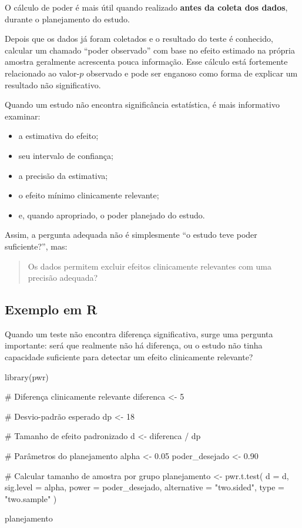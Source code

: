 \begin{error}

O cálculo de poder é mais útil quando realizado \textbf{antes da coleta dos
dados}, durante o planejamento do estudo.

Depois que os dados já foram coletados e o resultado do teste é conhecido,
calcular um chamado ``poder observado'' com base no efeito estimado na própria
amostra geralmente acrescenta pouca informação. Esse cálculo está fortemente
relacionado ao valor-$p$ observado e pode ser enganoso como forma de explicar
um resultado não significativo.

Quando um estudo não encontra significância estatística, é mais informativo
examinar:

\begin{itemize}
    \item a estimativa do efeito;
    \item seu intervalo de confiança;
    \item a precisão da estimativa;
    \item o efeito mínimo clinicamente relevante;
    \item e, quando apropriado, o poder planejado do estudo.
\end{itemize}

Assim, a pergunta adequada não é simplesmente ``o estudo teve poder
suficiente?'', mas:

\begin{quote}
Os dados permitem excluir efeitos clinicamente relevantes com uma precisão
adequada?
\end{quote}
\end{error}

\subsection{Exemplo em R}

Quando um teste não encontra diferença significativa, surge uma pergunta
importante: será que realmente não há diferença, ou o estudo não tinha
capacidade suficiente para detectar um efeito clinicamente relevante?

\begin{code}
library(pwr)

# Diferença clinicamente relevante
diferenca <- 5

# Desvio-padrão esperado
dp <- 18

# Tamanho de efeito padronizado
d <- diferenca / dp

# Parâmetros do planejamento
alpha <- 0.05
poder_desejado <- 0.90

# Calcular tamanho de amostra por grupo
planejamento <- pwr.t.test(
  d = d,
  sig.level = alpha,
  power = poder_desejado,
  alternative = "two.sided",
  type = "two.sample"
)

planejamento
\end{code}

